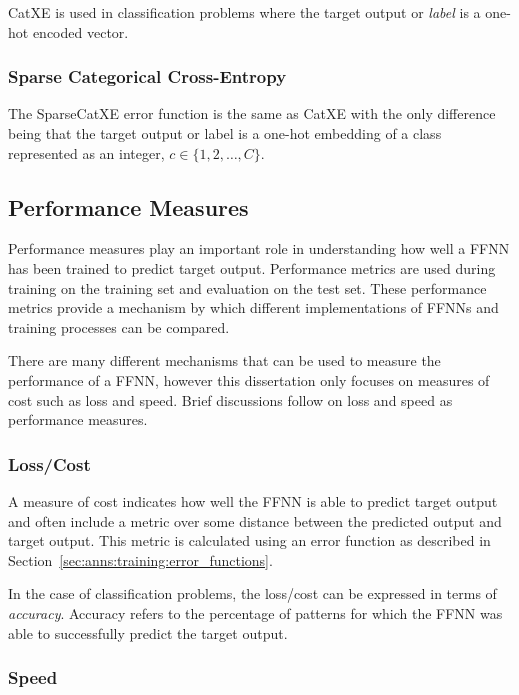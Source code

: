\ac{CatXE} is used in classification problems where the target
output or \textit{label} is a one-hot encoded vector.


\subsubsection{Sparse Categorical Cross-Entropy}
\label{sec:anns:training:error_functions:sparse_cat_xe}

The \ac{SparseCatXE} error function is the same as \ac{CatXE} with the only
difference being that the target output or label is a one-hot
embedding of a class represented as an integer, $c \in \{1,2, \dots, C\}$.


\subsection{Performance Measures}
\label{sec:anns:training:performance_measures}

Performance measures play an important role in understanding how well a
\ac{FFNN} has been trained to predict target output. Performance metrics are
used during training on the training set and evaluation on the test set. These
performance metrics provide a mechanism by which different implementations of
\acp{FFNN} and training processes can be compared.

There are many different mechanisms that can be used to measure the performance
of a \ac{FFNN}, however this dissertation only focuses on measures of cost such as
loss and speed. Brief discussions follow on loss and speed as performance
measures.

\subsubsection{Loss/Cost}
\label{sec:anns:training:performance_measure:loss_cost}

A measure of cost indicates how well the \ac{FFNN} is able to predict target
output and often include a metric over some distance between the predicted
output and target output. This metric is calculated using an error function as
described in Section~\ref{sec:anns:training:error_functions}.

In the case of classification problems, the loss/cost can be expressed in terms
of \textit{accuracy}. Accuracy refers to the percentage of patterns for which
the \ac{FFNN} was able to successfully predict the target output.

\subsubsection{Speed}
\label{sec:anns:training:performance_measure:speed}

